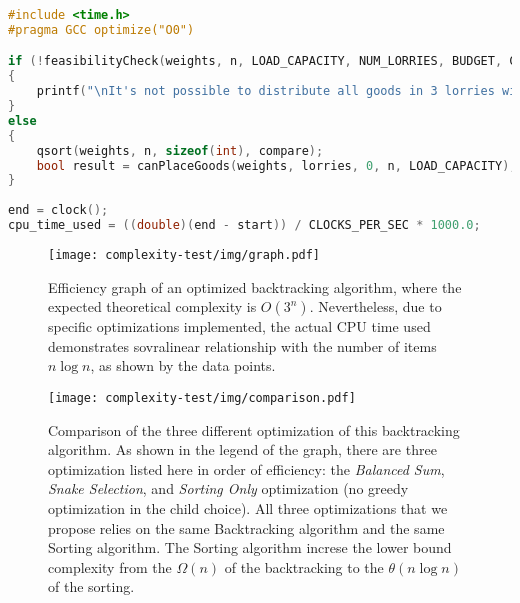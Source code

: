 \documentclass{article}
\begin{document}
\begin{itemize}
	      \begin{lstlisting}[language=C++, caption = Optimization settings and time measurement., label=lst:code4]
#include <time.h>
#pragma GCC optimize("O0")

if (!feasibilityCheck(weights, n, LOAD_CAPACITY, NUM_LORRIES, BUDGET, COST_PER_KG))		// O(n)
{
    printf("\nIt's not possible to distribute all goods in 3 lorries without exceeding the capacity of 20 Tm each.\n");
}
else
{
    qsort(weights, n, sizeof(int), compare);                           		// O(nlogn)
    bool result = canPlaceGoods(weights, lorries, 0, n, LOAD_CAPACITY); 	// O(3^n)
}
    
end = clock();
cpu_time_used = ((double)(end - start)) / CLOCKS_PER_SEC * 1000.0;
\end{lstlisting}

	      \begin{center}
		      \begin{figure}[!ht]
			      \centering
			      \texttt{[image: complexity-test/img/graph.pdf]}
			      \caption{Efficiency graph of an optimized backtracking algorithm, where the expected theoretical
				      complexity is \( O(3^n) \). 
                      Nevertheless, due to specific optimizations implemented, the actual CPU time used
				      demonstrates sovralinear relationship with the number of items \( n\log n \), as shown by the data points.}
			      \label{fig:complexity-graph}
		      \end{figure}
	      \end{center}

	      \begin{center}
		      \begin{figure}[!ht]
			      \centering
			      \texttt{[image: complexity-test/img/comparison.pdf]}
			      \caption{Comparison of the three different optimization of this backtracking algorithm.
                            As shown in the legend of the graph, there are three optimization listed here in order of 
                            efficiency: the \textit{Balanced Sum}, \textit{Snake Selection}, and \textit{Sorting Only} 
                            optimization (no greedy optimization in the child choice).
                            All three optimizations that we propose relies on the same Backtracking algorithm and the same Sorting algorithm.
                            The Sorting algorithm increse the lower bound complexity from the $\Omega(n)$ of the backtracking to the $\theta(n\log n)$ of the sorting.}
			      \label{fig:complexity-graph-comparison}
		      \end{figure}
	      \end{center}


\end{itemize}
\end{document}
